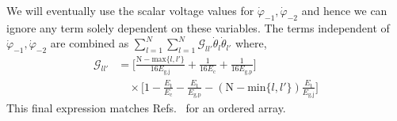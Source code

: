 \documentclass[%
reprint,
superscriptaddress,
 amsmath,amssymb,
 aps,
 prx,
longbibliography,
floatfix,
]{revtex4-2}
\begin{document}
We will eventually use the scalar voltage values for $\dot{\varphi}_{-1},\dot{\varphi}_{-2}$ and hence we can ignore any term solely dependent on these variables. The terms independent of $\dot{\varphi}_{-1},\dot{\varphi}_{-2}$ are combined as $\sum_{l=1}^{N}\sum_{l=1}^{N}\mathcal{G}_{ll'}\dot{\theta}_l\dot{\theta}_{l'}$ where,
\begin{align}
\mathcal{G}_{ll'}&=\Big[\frac{\textrm{N}-\text{max}\{l,l'\}}{16E_\textrm{g,j}}+\frac{1}{16E_\textrm{c}}+\frac{1}{16E_\textrm{g,p}}\Big]\nonumber\\&\quad\times\Big[1-\frac{E_\textrm{t}}{E_\textrm{c}}-\frac{E_\textrm{t}}{E_\textrm{g,p}}-(\textrm{N}-\text{min}\{l,l'\})\frac{E_\textrm{t}}{E_\textrm{g,j}}\Big]
\end{align}
This final expression matches Refs.~\cite{ferguson2013symmetries,viola2015collective} for an ordered array.
\end{document}
